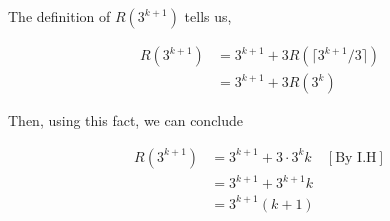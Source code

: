 \documentclass[12pt]{article}
\begin{document}
\begin{enumerate}[a.]
\begin{mdframed}
\begin{enumerate}[1.]
\begin{mdframed}
            \bigskip

            The definition of $R(3^{k+1})$ tells us,

            \begin{align}
                R(3^{k+1}) &= 3^{k+1} + 3R(\lceil 3^{k+1}/3 \rceil)\\
                &= 3^{k+1} + 3R(3^k)
            \end{align}

            \bigskip

            Then, using this fact, we can conclude

            \begin{align}
                R(3^{k+1}) &= 3^{k+1} + 3 \cdot 3^kk & [\text{By I.H}]\\
                &= 3^{k+1} + 3^{k+1}k\\
                &= 3^{k+1}(k + 1)
            \end{align}

            \end{mdframed}
        \end{enumerate}

    \end{mdframed}

\end{enumerate}
\end{document}
